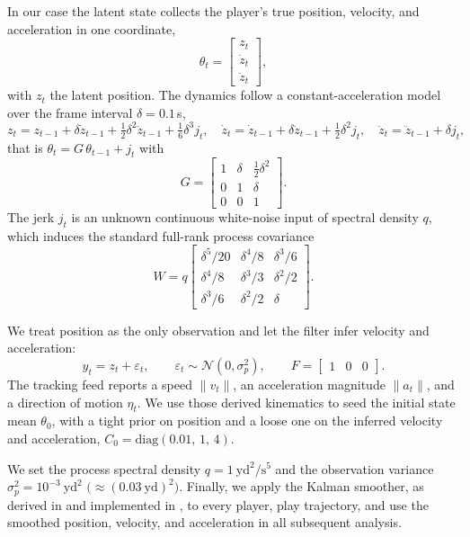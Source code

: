 \documentclass[USenglish]{article}
\theoremstyle{dgthm}
\theoremstyle{dgdef}
\begin{document}
\begin{appendices}
In our case the latent state collects the player's true position, velocity, and acceleration in one coordinate,
$$ \theta_t = \begin{bmatrix} z_t \\ \dot{z}_t \\ \ddot{z}_t \end{bmatrix}, $$
with $z_t$ the latent position. The dynamics follow a constant-acceleration model over the frame interval $\delta = 0.1$\,s,
$$ z_t = z_{t-1} + \delta \dot{z}_{t-1} + \tfrac{1}{2}\delta^2 \ddot{z}_{t-1} + \tfrac{1}{6}\delta^3 j_t, \quad \dot{z}_{t} = \dot{z}_{t-1} + \delta\ddot{z}_{t-1} + \tfrac{1}{2}\delta^2 j_t, \quad \ddot{z}_{t} = \ddot{z}_{t-1} + \delta j_t, $$
that is $\theta_t = G\,\theta_{t-1} + j_t$ with
$$ G = \begin{bmatrix} 1 & \delta & \tfrac{1}{2}\delta^2 \\ 0 & 1 & \delta \\ 0 & 0 & 1 \end{bmatrix}. $$
The jerk $j_t$ is an unknown continuous white-noise input of spectral density $q$, which induces the standard full-rank process covariance
$$ W = q \begin{bmatrix} \delta^5/20 & \delta^4/8 & \delta^3/6 \\ \delta^4/8 & \delta^3/3 & \delta^2/2 \\ \delta^3/6 & \delta^2/2 & \delta \end{bmatrix}. $$


We treat position as the only observation and let the filter infer velocity and acceleration:
$$ y_t = z_t + \varepsilon_t, \qquad \varepsilon_t \sim \mathcal{N}(0, \sigma_p^2), \qquad F = \begin{bmatrix} 1 & 0 & 0 \end{bmatrix}. $$
The tracking feed reports a speed $\lVert v_t\rVert$, an acceleration magnitude $\lVert a_t\rVert$, and a direction of motion $\eta_t$. We use those derived kinematics to seed the initial state mean $\theta_0$, with a tight prior on position and a loose one on the inferred velocity and acceleration, $C_0 = \mathrm{diag}(0.01,\,1,\,4)$.

We set the process spectral density $q = 1~\text{yd}^2/\text{s}^5$ and the observation variance $\sigma_p^2 = 10^{-3}~\text{yd}^2$ $\big(\!\approx (0.03~\text{yd})^2\big)$. Finally, we apply the Kalman smoother, as derived in \cite{Kalman} and implemented in \cite{pykalman}, to every player, play trajectory, and use the smoothed position, velocity, and acceleration in all subsequent analysis.




\end{appendices}
\end{document}
